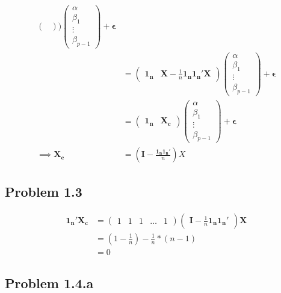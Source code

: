 \documentclass[a4paper]{article}
\begin{document}
\begin{align*}
\begin{pmatrix}
\end{pmatrix}\big)\begin{pmatrix}
\alpha\\
\beta_1\\
\vdots\\
\beta_{p-1}
\end{pmatrix} + \mathbf{\epsilon}\\
&= \begin{pmatrix}
\mathbf{1_n} & \mathbf{X}-\frac{1}{n}\mathbf{1_n1_n'X}
\end{pmatrix}\begin{pmatrix}
\alpha\\
\beta_1\\
\vdots\\
\beta_{p-1}
\end{pmatrix}+ \mathbf{\epsilon}\\
&= \begin{pmatrix}
\mathbf{1_n} & \mathbf{X_c}
\end{pmatrix}\begin{pmatrix}
\alpha\\
\beta_1\\
\vdots\\
\beta_{p-1}
\end{pmatrix}+ \mathbf{\epsilon}\\
\implies \mathbf{X_c} &= (\mathbf{I}-\frac{\mathbf{1_n1_n'}}{n})X
\end{align*}

\subsection*{Problem 1.3}

\begin{align*}
\mathbf{1_n'X_c} &= \begin{pmatrix}
1 & 1 & 1 & \dots & 1
\end{pmatrix} \begin{pmatrix}
\mathbf{I}-\frac{1}{n}\mathbf{1_n1_n'}
\end{pmatrix}\mathbf{X}\\
&= (1-\frac{1}{n}) -\frac{1}{n}*(n-1)\\
&= 0
\end{align*}

\subsection*{Problem 1.4.a}
\end{document}
